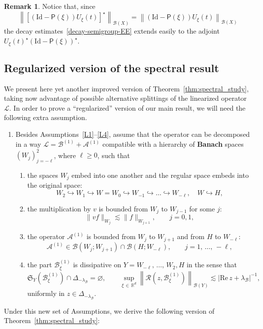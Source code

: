 \documentclass[10pt]{amsart}
\theoremstyle{definition}\newtheorem{defi}[theo]{Definition}\newtheorem{rema}[theo]{Remark}\newtheorem{exam}[theo]{Example}\newtheorem{exem}[theo]{Example}\newtheorem{nota}[theo]{Notation}
\newcommand{\Id}{\mathrm{Id}}
\newcommand{\re}{\mathrm{Re}\,}
\newcommand{\R}{\mathbb{R}}
\newcommand{\fkS}{\mathfrak{S}}
\renewcommand{\AA}{\mathcal{A}}
\newcommand{\BB}{\mathcal{B}}
\newcommand{\LL}{\mathcal{L}}
\newcommand{\PP}{\mathsf{P}}
\newcommand{\RR}{\mathcal{R}}
\newcommand{\BBB}{\mathscr{B}}
\newcommand{\Ss}{H}
\newcommand{\Sl}{X}
\newcommand{\Sg}{Y}
\newcommand{\Sr}{W}
\renewcommand*\ge{\geqslant}
\newcommand{\hypst}[1]{\textnormal{\textbf{#1}}}
\begin{document}
\begin{rema}
Notice that, since
\[
\left\|\left[\left(\Id-\PP(\xi)\right)U_{\xi}(t)\right]^{\star}\right\|_{\BBB(\Sl)}=\left\|\left(\Id-\PP(\xi)\right)U_{\xi}(t)\right\|_{\BBB(\Sl)}
\]
the decay estimates~\eqref{decay-semigroup-EE} extends easily to the adjoint $ U_{\xi}(t)^{\star} {(\Id - \PP(\xi))^{\star}}$.
\end{rema}

\subsection{Regularized version of the spectral result}\label{sec:LR}
We present here yet another improved version of Theorem~\ref{thm:spectral_study}, taking now advantage of possible alternative splittings of the linearized operator $\LL$. In order to prove a ``regularized'' version of our main result, we will need the following extra assumption.
\begin{enumerate}[label=\hypst{LR}]
\item \label{LR}
Besides Assumptions~\eqref{L1}--\eqref{L4}, assume that the operator can be decomposed in a way $\LL = \BB^{(1)} + \AA^{(1)}$ compatible with a hierarchy of \textbf{Banach} spaces $(\Sr_j)_{j=-\ell}^{2}$, where $\ell \ge 0$, such that
\begin{enumerate}
\item\label{LRa} the spaces $\Sr_j$ embed into one another and the regular space embeds into the original space:
\[
\Sr_2 \hookrightarrow \Sr_1 \hookrightarrow \Sr = \Sr_{0} \hookrightarrow \Sr_{-1} \hookrightarrow \dots \hookrightarrow \Sr_{-\ell}, \quad \Sr \hookrightarrow \Ss,
\]
\item\label{LRb} the multiplication by $v$ is bounded from $\Sr_{j}$ to $\Sr_{j-1}$ for some $j$:
\[
\|vf\|_{\Sr_{j}} \lesssim \|f\|_{\Sr_{j+1}}, \quad \quad j=0,1,
\]
\item \label{ass:reg_A_reg}
the operator $\AA^{(1)}$ is bounded from $\Sr_{j}$ to $\Sr_{j+1}$ and from $\Ss$ to $\Sr_{-\ell}$:
\[
\AA^{(1)} \in \BBB\left(\Sr_{j};\Sr_{j+1}\right) \cap \BBB(\Ss;\Sr_{-\ell}), \qquad j=1,\,\ldots,\,-\ell,
\]
\item \label{ass:reg_diss}
the part $\BB^{(1)}_{\xi}$ is dissipative on $\Sg = \Sr_{-\ell},\,\dots,\,\Sr_2, \Ss$ in the sense that
\[
\fkS_{\Sg}\left(\BB^{(1)}_{\xi}\right) \cap \Delta_{-\lambda_{\BB}} = \varnothing, \qquad \sup_{\xi\,\in\,\R^d}\left\|\RR\left(z,\BB^{(1)}_{\xi}\right)\right\|_{\BBB(\Sg)} \lesssim | \re z + \lambda_\BB|^{-1},
\]
uniformly in $z \in \Delta_{-\lambda_{\BB}}$.
\end{enumerate}
\end{enumerate}
Under this new set of Assumptions, we derive the following version of Theorem~\ref{thm:spectral_study}:
\end{document}
